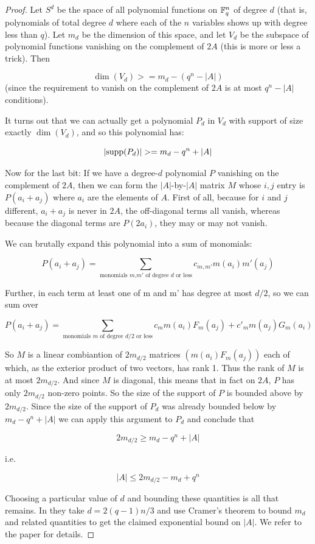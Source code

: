 \documentclass{report}
\theoremstyle{remark}
\numberwithin{equation}{section}
\begin{document}
\begin{proof}Let $S^d$ be the space of all polynomial functions on
  $\mathbb{F}_q^n$ of degree $d$ (that is, polynomials of total degree $d$
  where each of the $n$ variables shows up with degree less than $q$).
  Let $m_d$ be the dimension of this space, and let $V_d$ be the
  subspace of polynomial functions vanishing on the complement of $2A$
  (this is more or less a trick).  Then

  \[\dim(V_d) >= m_d - (q^n - |A|)\]
  (since the requirement to vanish on the complement of $2A$ is at most
  $q^n - |A|$ conditions).
  
  It turns out that we can actually get a polynomial $P_d$ in $V_d$ with
  support of size exactly $\dim(V_d)$, and so this polynomial has:
  
  \[|\text{supp}(P_d)| >= m_d - q^n + |A|\]
  
  Now for the last bit: If we have a degree-$d$ polynomial $P$
  vanishing on the complement of $2A$, then we can form the
  $|A|$-by-$|A|$ matrix $M$ whose $i,j$ entry is $P(a_i + a_j)$ where
  $a_i$ are the elements of $A$.  First of all, because for $i$ and
  $j$ different, $a_i+a_j$ is never in $2A$, the off-diagonal terms
  all vanish, whereas because the diagonal terms are $P(2a_i)$, they
  may or may not vanish.
  
  
  We can brutally expand this polynomial into a sum of monomials:
  
  \[P(a_i + a_j) = \sum_{\text{monomials $m$,$m'$ of degree $d$ or less}} c_{m,m'} m(a_i) m'(a_j)\]
  
  Further, in each term at least one of m and m' has degree at most
  $d/2$, so we can sum over
  
  \[P(a_i + a_j) = \displaystyle\sum_{\text{monomials $m$ of degree $d/2$ or less}} c_{m} m(a_i) F_m(a_j) + c'_m m(a_j) G_m(a_i)\]
  
  So $M$ is a linear combiantion of $2 m_{d/2}$ matrices
  $(m(a_i) F_m(a_j))$ each of which, as the exterior product of two
  vectors, has rank 1.  Thus the rank of $M$ is at most $2 m_{d/2}$.
  And since $M$ is diagonal, this means that in fact on $2A$, $P$ has
  only $2 m_{d/2}$ non-zero points.  So the size of the support of $P$
  is bounded above by $2 m_{d/2}$.  Since the size of the support of
  $P_d$ was already bounded below by $m_d - q^n + |A|$ we can apply
  this argument to $P_d$ and conclude that
  
  \[2 m_{d/2} \geq m_d - q^n + |A|\]
  
  i.e.
  
  \[|A| \leq 2 m_{d/2} - m_d + q^n\]

  Choosing a particular value of $d$ and bounding these quantities is
  all that remains.  In \cite{ellenberg:preprint} they take
  $d = 2(q-1)n/3$ and use Cramer's theorem to bound $m_d$ and related
  quantities to get the claimed exponential bound on $|A|$.  We refer
  to the paper for details.
\end{proof}
\end{document}
